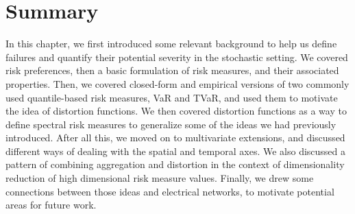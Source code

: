 \section{Summary}

In this chapter, we first introduced some relevant background to help us define failures and quantify their potential severity in the stochastic setting. We covered risk preferences, then a basic formulation of risk measures, and their associated properties. Then, we covered closed-form and empirical versions of two commonly used quantile-based risk measures, VaR and TVaR, and used them to motivate the idea of distortion functions. We then covered distortion functions as a way to define spectral risk measures to generalize some of the ideas we had previously introduced. After all this, we moved on to multivariate extensions, and discussed different ways of dealing with the spatial and temporal axes. We also discussed a pattern of combining aggregation and distortion in the context of dimensionality reduction of high dimensional risk measure values. Finally, we drew some connections between those ideas and electrical networks, to motivate potential areas for future work.